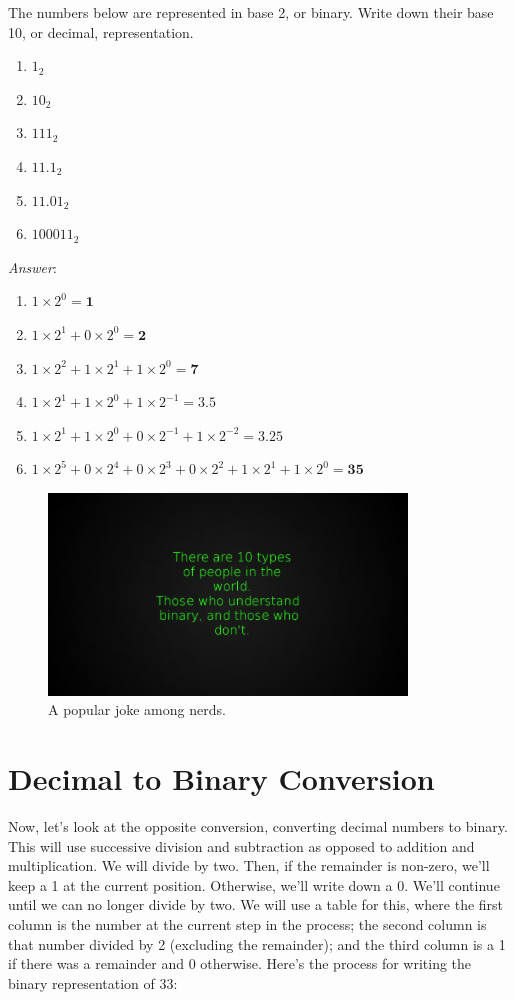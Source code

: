 \begin{example}
The numbers below are represented in base 2, or binary. Write down their base 10, or decimal, representation. 
\begin{enumerate}
\item $1_{2}$
\item $10_{2}$
\item $111_{2}$
\item $11.1_{2}$
\item $11.01_{2}$
\item $100011_{2}$
\end{enumerate}
\noindent \emph{Answer}:
\begin{enumerate}
\item $1\times2^0=\mathbf{1}$
\item $1\times2^1+0\times2^0=\mathbf{2}$
\item $1\times2^2+1\times2^1+1\times2^0=\mathbf{7}$
\item $1\times2^1+1\times2^0+1\times2^{-1}=\mathbf{3.5}$
\item $1\times2^1+1\times2^0+0\times2^{-1}+1\times2^{-2}=\mathbf{3.25}$
\item $1\times2^5+0\times2^4+0\times2^3+0\times2^2+1\times2^1+1\times2^0=\mathbf{35}$
\end{enumerate}
\end{example}

\begin{figure}
	\centering
	\includegraphics[width=0.85\textwidth]{images/binary_joke}
	\caption{A popular joke among nerds.}
	\label{fig:binary_joke}
\end{figure}

\section{Decimal to Binary Conversion}
Now, let’s look at the opposite conversion, converting decimal numbers to
binary. This will use successive division and subtraction as opposed to
addition and multiplication. We will divide by two. Then, if the
remainder is non-zero, we’ll keep a 1 at the current position. Otherwise, we'll write down a 0. We’ll
continue until we can no longer divide by two. We will use a table for this, where the first column is the number at the current step in the process; the second column is that number divided by 2 (excluding the remainder); and the third column is a 1 if there was a remainder and 0 otherwise. Here's the process for writing the binary representation of 33: 

